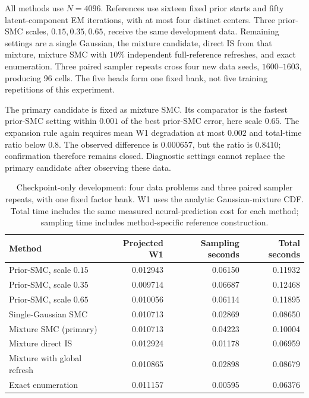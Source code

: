 All methods use $N=4096$. References use sixteen fixed prior starts and fifty latent-component EM iterations, with at most four distinct centers. Three prior-SMC scales, $0.15,0.35,0.65$, receive the same development data. Remaining settings are a single Gaussian, the mixture candidate, direct IS from that mixture, mixture SMC with $10\%$ independent full-reference refreshes, and exact enumeration. Three paired sampler repeats cross four new data seeds, $1600$--$1603$, producing 96 cells. The five heads form one fixed bank, not five training repetitions of this experiment.

The primary candidate is fixed as mixture SMC. Its comparator is the fastest prior-SMC setting within $0.001$ of the best prior-SMC error, here scale $0.65$. The expansion rule again requires mean W1 degradation at most $0.002$ and total-time ratio below $0.8$. The observed difference is $0.000657$, but the ratio is $0.8410$; confirmation therefore remains closed. Diagnostic settings cannot replace the primary candidate after observing these data.

\begin{table}[h]
\centering\small
\caption{Checkpoint-only development: four data problems and three paired sampler repeats, with one fixed factor bank. W1 uses the analytic Gaussian-mixture CDF. Total time includes the same measured neural-prediction cost for each method; sampling time includes method-specific reference construction.}
\label{tab:learned-factor-development}
\begin{tabular}{lrrr}
\toprule
Method & Projected W1 & Sampling seconds & Total seconds\\
\midrule
Prior-SMC, scale $0.15$ & 0.012943 & 0.06150 & 0.11932\\
Prior-SMC, scale $0.35$ & 0.009714 & 0.06687 & 0.12468\\
Prior-SMC, scale $0.65$ & 0.010056 & 0.06114 & 0.11895\\
Single-Gaussian SMC & 0.010713 & 0.02869 & 0.08650\\
Mixture SMC (primary) & 0.010713 & 0.04223 & 0.10004\\
Mixture direct IS & 0.012924 & 0.01178 & 0.06959\\
Mixture with global refresh & 0.010865 & 0.02898 & 0.08679\\
Exact enumeration & 0.011157 & 0.00595 & 0.06376\\
\bottomrule
\end{tabular}
\end{table}

